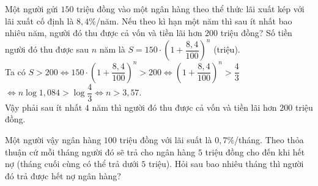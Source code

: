 \begin{bt}%
Một người gửi $150$ triệu đồng vào một ngân hàng theo thể thức lãi xuất kép với lãi xuất cố định là $8,4\%$/năm. Nếu theo kì hạn một năm thì sau ít nhất bao nhiêu năm, người đó thu được cả vốn và tiền lãi hơn $200$ triệu đồng?
\loigiai
{
Số tiền người đó thu được sau $n$ năm là $S=150\cdot{\left(1+\dfrac{8,4}{100}\right)^n}$ (triệu).\\
Ta có $S>200\Leftrightarrow 150 \cdot{\left(1+\dfrac{8,4}{100}\right)^n}>200 \Leftrightarrow{\left(1+\dfrac{8,4}{100}\right)^n}>\dfrac{4}{3}$ \\
$\Leftrightarrow n\log 1,084>\log \dfrac{4}{3}\Leftrightarrow n>3,57$.\\
Vậy phải sau ít nhất $4$ năm thì người đó thu được cả vốn và tiền lãi hơn $200$ triệu đồng.
}
\end{bt}

\begin{bt}%
	Một người vậy ngân hàng $100$ triệu đồng với lãi suất là $0{,}7\%$/tháng. Theo thỏa thuận cứ mỗi tháng người đó sẽ trả cho ngân hàng $5$ triệu đồng cho đến khi hết nợ (tháng cuối cùng có thể trả dưới $5$ triệu). Hỏi sau bao nhiêu tháng thì người đó trả được hết nợ ngân hàng?
	\par{}
\end{bt}

